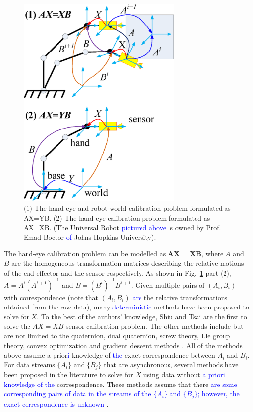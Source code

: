 \documentclass[letterpaper, 10 pt, conference]{ieeeconf}  %
\begin{document}
\begin{figure}[t!]
\centering
\includegraphics[width=3.2in]{fig1.eps}
\caption{
(1) The hand-eye and robot-world calibration problem %
formulated as AX=YB. (2) The hand-eye calibration problem %
formulated as AX=XB. (The Universal Robot \textcolor{blue}{pictured above} %
is owned by Prof. Emad Boctor \textcolor{blue}{of} %
Johns Hopkins University). 
}
\label{fig1}
\end{figure}

The hand-eye calibration problem can be modelled as $\textbf{AX = XB}$, where $A$ and $B$ are the homogeneous transformation matrices describing the relative motions of the end-effector and the  sensor respectively. As shown in Fig.~\ref{fig1} part (2), {\color{red}$A = A^{i}(A^{i+1})^{-1}$ and  $B = (B^{i})^{-1}B^{i+1}$}. Given multiple pairs of $(A_i,B_i)$ with correspondence (note that $(A_i,B_i)$ %
\textcolor{blue}{are} the relative transformations obtained from the raw data), many \textcolor{blue}{deterministic} methods have been proposed to solve for $X$. To the best of the authors' knowledge, Shiu \cite{Shiu1989} and Tsai \cite{Tsai1989} are the first to solve the $AX = XB$ sensor calibration problem. The other methods include but are not limited to the quaternion, dual quaternion, screw theory, Lie group theory, convex optimization and gradient descent methods \cite{Wang1992,Park1994,Horaud1995,Daniilidis1999,Fassi2005,Zhao2011,Ackerman2014a}. All of the methods above assume a prior\textcolor{blue}{i} knowledge of \textcolor{blue}{the} exact correspondence between $A_i$ and $B_i$. For data streams $\{A_i\}$ and $\{B_j\}$ that are asynchronous, several methods have been proposed in the literature to solve for $X$ using data without \textcolor{blue}{a priori knowledge of the} correspondence. These %
  methods assume that there \textcolor{blue}{are some corresponding pairs of data in the streams of the $\{A_i\}$ and $\{B_j\}$; however,  the exact correspondence is unknown}%
   \cite{Ackerman2013a,Ackerman2013,Ackerman2014}.
\end{document}
